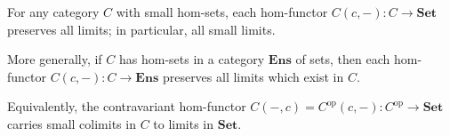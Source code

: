For any category $C$ with small hom-sets, each hom-functor $C(c, -): C \rightarrow \mathbf{Set}$ preserves all limits; in particular, all small limits.

More generally, if $C$ has hom-sets in a category $\mathbf{Ens}$ of sets, then each hom-functor $C(c, -): C \rightarrow \mathbf{Ens}$ preserves all limits which exist in $C$.

Equivalently, the contravariant hom-functor $C(-, c) = C^{\text{op}}(c, -): C^{\text{op}} \rightarrow \mathbf{Set}$ carries small colimits in $C$ to limits in $\mathbf{Set}$.
